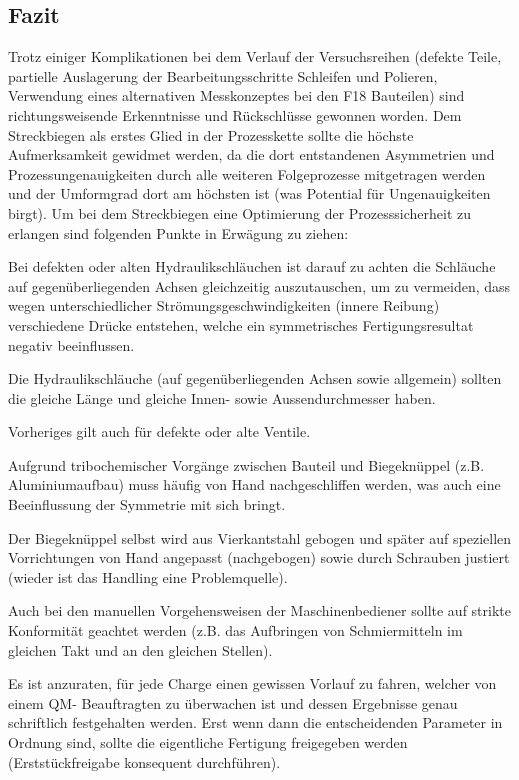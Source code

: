 \documentclass[12pt,a4paper,parskip,twoside,BCOR5mm,headsepline]{scrartcl}
\begin{document}
\begin{description*}
\newpage

\subsection{Fazit}
Trotz einiger Komplikationen bei dem Verlauf der Versuchsreihen (defekte Teile, partielle Auslagerung der Bearbeitungsschritte Schleifen und Polieren, Verwendung eines alternativen Messkonzeptes bei den F18 Bauteilen) sind richtungsweisende Erkenntnisse und Rückschlüsse gewonnen worden. Dem Streckbiegen als erstes Glied in der Prozesskette sollte die höchste Aufmerksamkeit gewidmet werden,  da die dort entstandenen Asymmetrien und Prozessungenauigkeiten durch alle weiteren Folgeprozesse mitgetragen werden und der Umformgrad dort am höchsten ist (was Potential für Ungenauigkeiten birgt). Um bei dem Streckbiegen eine Optimierung der Prozesssicherheit zu erlangen  sind folgenden Punkte in Erwägung zu ziehen:
\begin{itemize*}
\item Bei defekten oder alten Hydraulikschläuchen ist darauf zu achten die Schläuche auf gegenüberliegenden Achsen gleichzeitig auszutauschen, um zu vermeiden, dass wegen unterschiedlicher Strömungsgeschwindigkeiten (innere Reibung) verschiedene Drücke entstehen, welche ein symmetrisches Fertigungsresultat negativ beeinflussen.
\item Die Hydraulikschläuche (auf gegenüberliegenden Achsen sowie allgemein) sollten die gleiche Länge und gleiche Innen- sowie Aussendurchmesser haben.
\item Vorheriges gilt auch für defekte oder alte Ventile.
\item Aufgrund tribochemischer Vorgänge zwischen Bauteil und Biegeknüppel (z.B. Aluminiumaufbau) muss häufig von Hand nachgeschliffen werden, was auch eine Beeinflussung der Symmetrie mit sich bringt.
\item Der Biegeknüppel selbst wird aus Vierkantstahl gebogen und später auf speziellen Vorrichtungen von Hand angepasst (nachgebogen) sowie durch Schrauben justiert (wieder ist das Handling eine Problemquelle). 
\item Auch bei den manuellen Vorgehensweisen der Maschinenbediener sollte auf  strikte Konformität geachtet werden (z.B. das Aufbringen von Schmiermitteln im gleichen Takt und an den gleichen Stellen).
\item Es ist anzuraten, für jede Charge einen gewissen Vorlauf zu fahren, welcher von einem QM- Beauftragten zu überwachen ist und dessen Ergebnisse genau schriftlich festgehalten werden. Erst wenn dann die entscheidenden Parameter in Ordnung sind, sollte die eigentliche Fertigung freigegeben werden (Erststückfreigabe konsequent durchführen).

\end{itemize*}
\end{description*}
\end{document}
